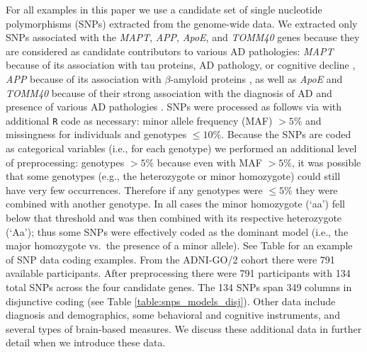 \documentclass[12pt]{article}
\begin{document}
For all examples in this paper we use a candidate set of single
nucleotide polymorphisms (SNPs) extracted from the genome-wide data. We
extracted only SNPs associated with the \textit{MAPT}, \textit{APP},
\textit{ApoE}, and \textit{TOMM40} genes because they are considered as
candidate contributors to various AD pathologies: \textit{MAPT} because
of its association with tau proteins, AD pathology, or cognitive decline
\citep{myers_h1c_2005, trabzuni_mapt_2012, desikan_genetic_2015, cruchaga_rare_2012, peterson_variants_2014},
\textit{APP} because of its association with \(\beta\)-amyloid proteins
\citep{cruchaga_rare_2012, huang_apoe2_2017, jonsson_mutation_2012}, as
well as \textit{ApoE} and \textit{TOMM40} because of their strong
association with the diagnosis of AD and presence of various AD
pathologies
\citep{linnertz_cis-regulatory_2014, roses_tomm40_2010-1, bennet_pleiotropy_2010, huang_apoe2_2017}.
SNPs were processed as follows via \citet{purcell2007plink} with
additional \texttt{R} code as necessary: minor allele frequency (MAF)
\(> 5\%\) and missingness for individuals and genotypes \(\leq 10\%\).
Because the SNPs are coded as categorical variables (i.e., for each
genotype) we performed an additional level of preprocessing: genotypes
\(> 5\%\) because even with MAF \(> 5\%\), it was possible that some
genotypes (e.g., the heterozygote or minor homozygote) could still have
very few occurrences. Therefore if any genotypes were \(\leq 5\%\) they
were combined with another genotype. In all cases the minor homozygote
(`aa') fell below that threshold and was then combined with its
respective heterozygote (`Aa'); thus some SNPs were effectively coded as
the dominant model (i.e., the major homozygote vs.~the presence of a
minor allele). See Table for an example of SNP data coding examples.
From the ADNI-GO/2 cohort there were 791 available participants. After
preprocessing there were 791 participants with 134 total SNPs across the
four candidate genes. The 134 SNPs span 349 columns in disjunctive
coding (see Table \ref{table:snps_models_disj}). Other data include
diagnosis and demographics, some behavioral and cognitive instruments,
and several types of brain-based measures. We discuss these additional
data in further detail when we introduce these data.
\end{document}
